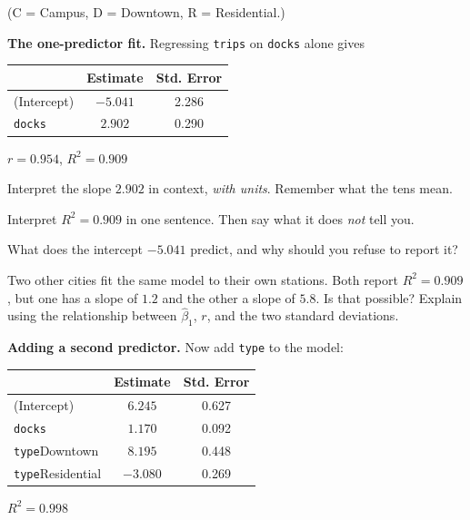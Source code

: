 \documentclass[11pt]{article}
\newcommand{\answerspace}[1]{\vspace{#1}}
\begin{document}
\noindent (C = Campus, D = Downtown, R = Residential.)

\begin{questions}

\item \textbf{The one-predictor fit.} Regressing \texttt{trips} on \texttt{docks} alone gives

\begin{center}
\renewcommand{\arraystretch}{1.2}
\begin{tabular}{lcc}
\toprule
 & \textbf{Estimate} & \textbf{Std. Error} \\
\midrule
(Intercept) & $-5.041$ & 2.286 \\
\texttt{docks} & $2.902$ & 0.290 \\
\bottomrule
\end{tabular}
\qquad
$r = 0.954$, \quad $R^2 = 0.909$
\end{center}

\begin{parts}
\item Interpret the slope $2.902$ in context, \emph{with units}. Remember what the tens mean.
\answerspace{4em}

\item Interpret $R^2 = 0.909$ in one sentence. Then say what it does \emph{not} tell you.
\answerspace{4em}

\item What does the intercept $-5.041$ predict, and why should you refuse to report it?
\answerspace{3.5em}

\item Two other cities fit the same model to their own stations. Both report $R^2 = 0.909$, but
one has a slope of $1.2$ and the other a slope of $5.8$. Is that possible? Explain using the
relationship between $\hat\beta_1$, $r$, and the two standard deviations.
\answerspace{4.5em}
\end{parts}

\item \textbf{Adding a second predictor.} Now add \texttt{type} to the model:

\begin{center}
\renewcommand{\arraystretch}{1.2}
\begin{tabular}{lcc}
\toprule
 & \textbf{Estimate} & \textbf{Std. Error} \\
\midrule
(Intercept) & $6.245$ & 0.627 \\
\texttt{docks} & $1.170$ & 0.092 \\
\texttt{type}Downtown & $8.195$ & 0.448 \\
\texttt{type}Residential & $-3.080$ & 0.269 \\
\bottomrule
\end{tabular}
\qquad
$R^2 = 0.998$
\end{center}


\end{questions}
\end{document}
